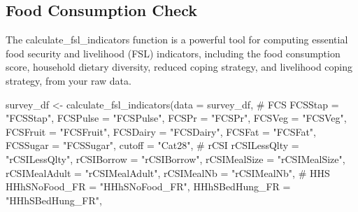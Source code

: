 \documentclass[
  letterpaper,
  DIV=11,
  numbers=noendperiod]{scrreprt}
\newenvironment{Shaded}{\begin{snugshade}}{\end{snugshade}}
\newcommand{\AttributeTok}[1]{\textcolor[rgb]{0.40,0.45,0.13}{#1}}
\newcommand{\CommentTok}[1]{\textcolor[rgb]{0.37,0.37,0.37}{#1}}
\newcommand{\FunctionTok}[1]{\textcolor[rgb]{0.28,0.35,0.67}{#1}}
\newcommand{\NormalTok}[1]{\textcolor[rgb]{0.00,0.23,0.31}{#1}}
\newcommand{\OtherTok}[1]{\textcolor[rgb]{0.00,0.23,0.31}{#1}}
\newcommand{\StringTok}[1]{\textcolor[rgb]{0.13,0.47,0.30}{#1}}
\begin{document}
\hypertarget{food-consumption-check}{%
\subsection{Food Consumption Check}\label{food-consumption-check}}

The calculate\_fsl\_indicators function is a powerful tool for computing
essential food security and livelihood (FSL) indicators, including the
food consumption score, household dietary diversity, reduced coping
strategy, and livelihood coping strategy, from your raw data.

\begin{Shaded}
\begin{Highlighting}[]
\NormalTok{survey\_df }\OtherTok{\textless{}{-}} \FunctionTok{calculate\_fsl\_indicators}\NormalTok{(}\AttributeTok{data =}\NormalTok{ survey\_df,}
                                 \CommentTok{\# FCS}
                                 \AttributeTok{FCSStap =} \StringTok{"FCSStap"}\NormalTok{, }
                                 \AttributeTok{FCSPulse =} \StringTok{"FCSPulse"}\NormalTok{, }
                                 \AttributeTok{FCSPr =} \StringTok{"FCSPr"}\NormalTok{, }
                                 \AttributeTok{FCSVeg =} \StringTok{"FCSVeg"}\NormalTok{, }
                                 \AttributeTok{FCSFruit =} \StringTok{"FCSFruit"}\NormalTok{,}
                                 \AttributeTok{FCSDairy =} \StringTok{"FCSDairy"}\NormalTok{, }
                                 \AttributeTok{FCSFat =} \StringTok{"FCSFat"}\NormalTok{, }
                                 \AttributeTok{FCSSugar =} \StringTok{"FCSSugar"}\NormalTok{, }
                                 \AttributeTok{cutoff =} \StringTok{"Cat28"}\NormalTok{, }
                                 \CommentTok{\# rCSI}
                                 \AttributeTok{rCSILessQlty =} \StringTok{"rCSILessQlty"}\NormalTok{, }
                                 \AttributeTok{rCSIBorrow =} \StringTok{"rCSIBorrow"}\NormalTok{, }
                                 \AttributeTok{rCSIMealSize =} \StringTok{"rCSIMealSize"}\NormalTok{, }
                                 \AttributeTok{rCSIMealAdult =} \StringTok{"rCSIMealAdult"}\NormalTok{, }
                                 \AttributeTok{rCSIMealNb =} \StringTok{"rCSIMealNb"}\NormalTok{,}
                                 \CommentTok{\# HHS}
                                 \AttributeTok{HHhSNoFood\_FR =} \StringTok{"HHhSNoFood\_FR"}\NormalTok{, }
                                 \AttributeTok{HHhSBedHung\_FR =} \StringTok{"HHhSBedHung\_FR"}\NormalTok{, }

\end{Highlighting}
\end{Shaded}
\end{document}
